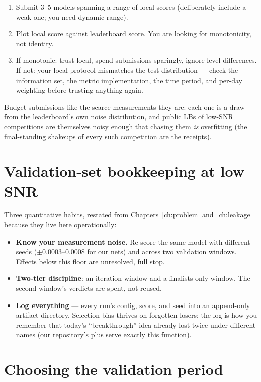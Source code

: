 \begin{enumerate}
\item Submit 3--5 models spanning a range of local scores (deliberately
  include a weak one; you need dynamic range).
\item Plot local score against leaderboard score. You are looking for
  monotonicity, not identity.
\item If monotonic: trust local, spend submissions sparingly, ignore
  level differences. If not: your local protocol mismatches the test
  distribution --- check the information set, the metric implementation,
  the time period, and per-day weighting before trusting anything again.
\end{enumerate}

Budget submissions like the scarce measurements they are: each one is a
draw from the leaderboard's own noise distribution, and public LBs of
low-SNR competitions are themselves noisy enough that chasing them
\emph{is} overfitting (the final-standing shakeups of every such
competition are the receipts).

\section{Validation-set bookkeeping at low SNR}

Three quantitative habits, restated from Chapters~\ref{ch:problem}
and~\ref{ch:leakage} because they live here operationally:

\begin{itemize}
\item \textbf{Know your measurement noise.} Re-score the same model with
  different seeds ($\pm 0.0003$--$0.0008$ for our nets) and across two
  validation windows. Effects below this floor are unresolved, full stop.
\item \textbf{Two-tier discipline}: an iteration window and a
  finalists-only window. The second window's verdicts are spent, not
  reused.
\item \textbf{Log everything} --- every run's config, score, and seed into
  an append-only artifact directory. Selection bias thrives on forgotten
  losers; the log is how you remember that today's ``breakthrough'' idea
  already lost twice under different names (our repository's
   plus  serve exactly
  this function).
\end{itemize}

\section{Choosing the validation period}

